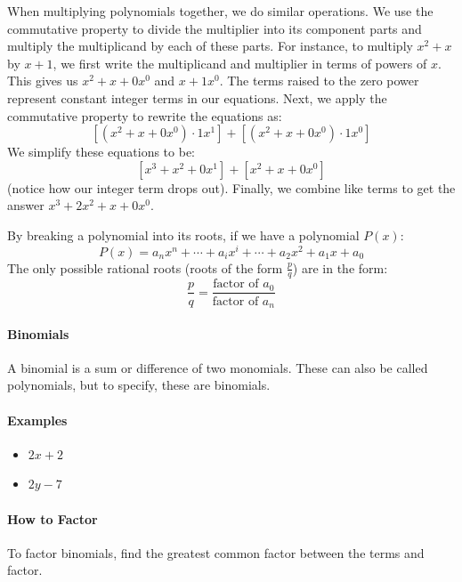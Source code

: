When multiplying polynomials together, we do similar operations. We use the commutative property to divide the multiplier into its component parts and multiply the multiplicand by each of these parts. For instance, to multiply $x^2 + x$ by $x + 1$, we first write the multiplicand and multiplier in terms of powers of $x$. This gives us $x^2 + x + 0x^0$ and $x + 1x^0$. The terms raised to the zero power represent constant integer terms in our equations. Next, we apply the commutative property to rewrite the equations as:
$$
[(x^2 + x + 0x^0) \cdot 1x^1] + [(x^2 + x + 0x^0) \cdot 1x^0]
$$
We simplify these equations to be:
$$
[x^3 + x^2 + 0x^1] + [x^2 + x + 0x^0]
$$
(notice how our integer term drops out). Finally, we combine like terms to get the answer $x^3 + 2x^2 + x + 0x^0$. 



By breaking a polynomial into its roots, if we have a polynomial $P(x)$:
$$
P(x) = a_n x^n + \cdots + a_i x^i + \cdots + a_2 x^2 + a_1 x + a_0
$$
The only possible rational roots (roots of the form $\frac{p}{q}$) are in the form:
$$
\frac{p}{q} = \frac{\text{factor of } a_0}{\text{factor of } a_n}
$$
\paragraph{Binomials}



A binomial is a sum or difference of two monomials. These can also be called polynomials, but to specify, these are binomials.



\paragraph{Examples}



\begin{itemize}
    \item $2x + 2$
    \item $2y - 7$
\end{itemize}

\paragraph{How to Factor}



To factor binomials, find the greatest common factor between the terms and factor.



